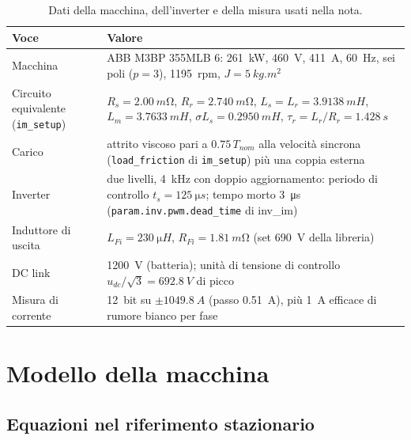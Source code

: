 \documentclass[10pt,a4paper]{scrartcl}
\newcommand{\code}[1]{\texttt{#1}}
\newcommand{\ts}{t_s}
\newcommand{\taur}{\tau_r}
\begin{document}
\begin{onehalfspace}
\begin{table}[H]
\centering\small
\begin{tabular}{@{}R{5.2cm}R{10.3cm}@{}}
\toprule
\textbf{Voce} & \textbf{Valore} \\
\midrule
Macchina & ABB M3BP 355MLB 6: \SI{261}{kW}, \SI{460}{V}, \SI{411}{A}, \SI{60}{Hz}, sei poli ($p = 3$), \SI{1195}{rpm}, $J = \SI{5}{kg.m^2}$ \\
Circuito equivalente (\code{im\_setup}) & $R_s = \SI{2.00}{m\ohm}$, $R_r = \SI{2.740}{m\ohm}$, $L_s = L_r = \SI{3.9138}{mH}$, $L_m = \SI{3.7633}{mH}$, $\sigma L_s = \SI{0.2950}{mH}$, $\taur = L_r/R_r = \SI{1.428}{s}$ \\
Carico & attrito viscoso pari a $0.75\,T_{nom}$ alla velocità sincrona (\code{load\_friction} di \code{im\_setup}) più una coppia esterna \\
Inverter & due livelli, \SI{4}{kHz} con doppio aggiornamento: periodo di controllo $\ts = \SI{125}{\micro s}$; tempo morto \SI{3}{\micro s} (\code{param.inv.pwm.dead\_time} di inv\_im) \\
Induttore di uscita & $L_{Fi} = \SI{230}{\micro H}$, $R_{Fi} = \SI{1.81}{m\ohm}$ (set \SI{690}{V} della libreria) \\
DC link & \SI{1200}{V} (batteria); unità di tensione di controllo $u_{dc}/\sqrt3 = \SI{692.8}{V}$ di picco \\
Misura di corrente & \SI{12}{bit} su $\pm\SI{1049.8}{A}$ (passo \SI{0.51}{A}), più \SI{1}{A} efficace di rumore bianco per fase \\
\bottomrule
\end{tabular}
\caption{Dati della macchina, dell'inverter e della misura usati nella nota.}
\label{tab:dati}
\end{table}

\section{Modello della macchina}
\label{sec:modello}

\subsection{Equazioni nel riferimento stazionario}
\label{sec:equazioni}


\end{onehalfspace}
\end{document}
